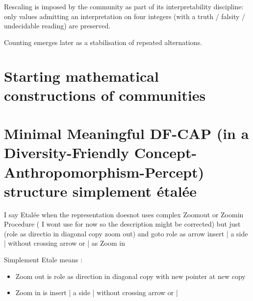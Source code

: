\documentclass{article}
\newcommand{\lightblue}[1]{{\color{cyan!50} #1}}
\newcommand{\darkblue}[1]{{\color{blue!70!black} #1}}
\begin{document}
Rescaling is imposed by the community as part of its interpretability discipline:
only values admitting an interpretation on four integers
(with a truth / falsity / undecidable reading)
are preserved.

Counting emerges later as a stabilisation of repeated alternations.
%
%
%
%
\section{Starting  mathematical constructions of communities}

\section{Minimal Meaningful DF-CAP (in a Diversity-Friendly Concept-Anthropomorphism-Percept) structure simplement étalée}

I say Etalée when the representation doesnot uses complex Zoomout or Zoomin Procedure ( I wont use for now so the description might be corrected) 
but just  (role as directio in diagonal copy zoom out) and goto role as arrow insert | a side | without crossing arrow or | as Zoom in  

Simplement Etale means :

\begin{itemize}
\item Zoom out is  role as direction in diagonal copy  with new pointer at new copy
\item Zoom in  is  insert | a side | without crossing arrow or |
\end{itemize}
 
\end{document}
